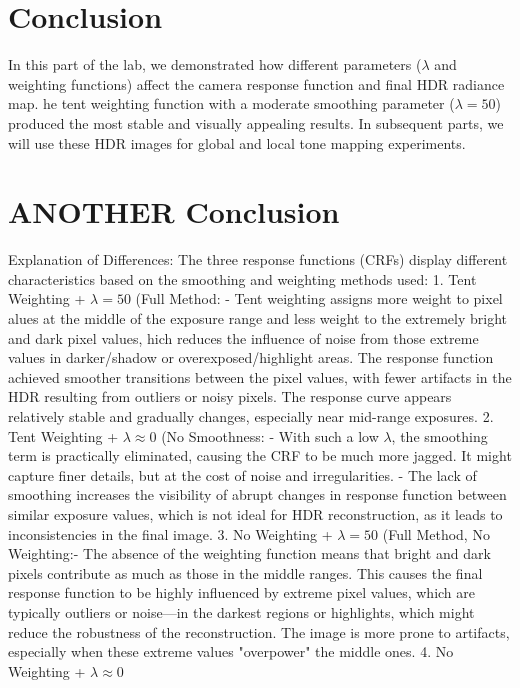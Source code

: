 \documentclass[a4paper,10pt]{article}
\begin{document}
\section{Conclusion}
In this part of the lab, we demonstrated how different parameters (\(\lambda\) and 
weighting functions) affect the camera response function and final HDR radiance map.  
he tent weighting function with a moderate smoothing parameter (\(\lambda=50\)) produced the most 
stable and visually appealing results.  In subsequent parts, we will use these HDR images for global 
and local tone mapping experiments.


\section{ANOTHER Conclusion}

Explanation of Differences: The three response functions (CRFs) 
display different characteristics based on the smoothing and weighting methods used: 1. 
Tent Weighting + \(\lambda = 50\) (Full Method: - Tent weighting assigns more weight to pixel
alues at the middle of the exposure range and less weight to the extremely bright and dark pixel values, 
hich reduces the influence of noise from those extreme values in darker/shadow or overexposed/highlight areas. 
The response function achieved smoother transitions between the pixel values, with fewer artifacts in the
HDR resulting from outliers or noisy pixels. The response curve appears relatively stable and gradually 
changes, especially near mid-range exposures. 2. Tent Weighting + \(\lambda \approx 0\) 
(No Smoothness: - With such a low \(\lambda\), the smoothing term is practically eliminated, 
causing the CRF to be much more jagged. It might capture finer details, but at the cost of noise 
and irregularities. - The lack of smoothing increases the visibility of abrupt changes in response
function between similar exposure values, which is not ideal for HDR reconstruction, as it leads 
to inconsistencies in the final image. 3. No Weighting + \(\lambda = 50\) 
(Full Method, No Weighting:- The absence of the weighting function means that bright and dark pixels contribute as much as those 
in the middle ranges. This causes the final response function to be highly influenced by extreme 
pixel values, which are typically outliers or noise—in the darkest regions or highlights, which 
might reduce the robustness of the reconstruction. The image is more prone to artifacts, especially
when these extreme values "overpower" the middle ones. 4. No Weighting + \(\lambda \approx 0\) 
\end{document}
